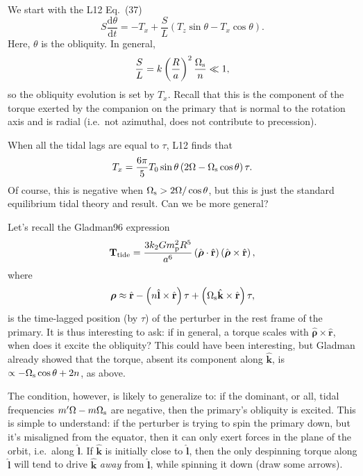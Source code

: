 \documentclass[12pt]{article}
\newcommand*{\rd}[2]{\frac{\mathrm{d}#1}{\mathrm{d}#2}}
\newcommand*{\bm}[1]{\boldsymbol{\mathbf{#1}}}
\newcommand*{\uv}[1]{\hat{\bm{#1}}}
\newcommand*{\p}[1]{\left(#1\right)}
\begin{document}
We start with the L12 Eq.~(37)
\begin{equation}
    S\rd{\theta}{t} = -T_x + \frac{S}{L}\p{T_z\sin\theta - T_x\cos\theta}.
\end{equation}
Here, $\theta$ is the obliquity. In general,
\begin{equation}
    \frac{S}{L} = k\p{\frac{R}{a}}^2\frac{\Omega_{\rm s}}{n} \ll 1,
\end{equation}
so the obliquity evolution is set by $T_x$. Recall that this is the
component of the torque exerted by the companion on the primary that is normal
to the rotation axis and is radial (i.e.\ not azimuthal, does not contribute to
precession).

When all the tidal lags are equal to $\tau$, L12 finds that
\begin{equation}
    T_x = \frac{6\pi}{5}T_0\sin\theta\p{2\Omega - \Omega_{\rm s}\cos\theta}
        \tau.
\end{equation}
Of course, this is negative when $\Omega_{\rm s} > 2\Omega / \cos\theta$, but
this is just the standard equilibrium tidal theory and result. Can we be more
general?

Let's recall the Gladman96 expression
\begin{equation}
    \bm{T}_{\rm tide}
        = \frac{3k_2Gm_{\rm p}^2R^5}{a^6}
            \p{\uv{\rho} \cdot \uv{r}}
            \p{\uv{\rho} \times \uv{r}},
\end{equation}
where
\begin{equation}
    \bm{\rho} \approx \uv{r} - \p{n\uv{l} \times \uv{r}}\tau
        +\p{\Omega_{\rm s}\uv{k} \times \uv{r}}\tau,
\end{equation}
is the time-lagged position (by $\tau$) of the perturber in the rest frame of
the primary. It is thus interesting to ask: if in general, a torque scales with
$\uv{\rho} \times \uv{r}$, when does it excite the obliquity? This could have
been interesting, but Gladman already showed that the torque, absent its
component along $\uv{k}$, is $\propto -\Omega_{\rm s} \cos\theta + 2n$, as
above.

The condition, however, is likely to generalize to: if the dominant, or all,
tidal frequencies $m'\Omega - m\Omega_{\rm s}$ are negative, then the primary's
obliquity is excited. This is simple to understand: if the perturber is trying
to spin the primary down, but it's misaligned from the equator, then it can only
exert forces in the plane of the orbit, i.e.\ along $\uv{l}$. If $\uv{k}$ is
initially close to $\uv{l}$, then the only despinning torque along $\uv{l}$ will
tend to drive $\uv{k}$ \emph{away} from $\uv{l}$, while spinning it down (draw
some arrows).
\end{document}
